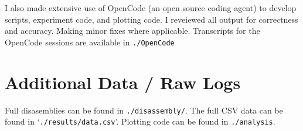 \documentclass[11pt]{article}
\begin{document}
I also made extensive use of OpenCode (an open source coding agent) to develop scripts, experiment code, and plotting
code. I reveiewed all output for correctness and accuracy. Making minor fixes where applicable. Transcripts for the
OpenCode sessions are available in \texttt{./OpenCode}

\section{Additional Data / Raw Logs}

Full disasemblies can be found in \texttt{./disassembly/}. The full CSV data can be found in
`\texttt{./results/data.csv}'. Plotting code can be found in \texttt{./analysis}.


\end{document}
